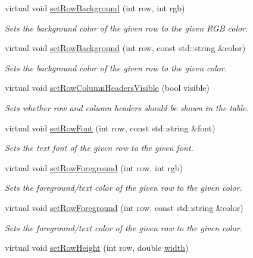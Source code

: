 \begin{DoxyCompactItemize}
virtual void \mbox{\hyperlink{classGTable_a85ee577aabd189ed64a5c9f66ba61fd2}{set\+Row\+Background}} (int row, int rgb)
\begin{DoxyCompactList}\small\item\em Sets the background color of the given row to the given R\+GB color. \end{DoxyCompactList}\item 
virtual void \mbox{\hyperlink{classGTable_a30c7073dfeac833056ed65a8bb9a7e08}{set\+Row\+Background}} (int row, const std\+::string \&color)
\begin{DoxyCompactList}\small\item\em Sets the background color of the given row to the given color. \end{DoxyCompactList}\item 
virtual void \mbox{\hyperlink{classGTable_a0d4a1d2a58daff8c1984e31b21f93ea1}{set\+Row\+Column\+Headers\+Visible}} (bool visible)
\begin{DoxyCompactList}\small\item\em Sets whether row and column headers should be shown in the table. \end{DoxyCompactList}\item 
virtual void \mbox{\hyperlink{classGTable_adaeccb3f3fd318185b8adc644aaca949}{set\+Row\+Font}} (int row, const std\+::string \&font)
\begin{DoxyCompactList}\small\item\em Sets the text font of the given row to the given font. \end{DoxyCompactList}\item 
virtual void \mbox{\hyperlink{classGTable_abe6e1382d3d98a9479cf43ac204b0ee3}{set\+Row\+Foreground}} (int row, int rgb)
\begin{DoxyCompactList}\small\item\em Sets the foreground/text color of the given row to the given color. \end{DoxyCompactList}\item 
virtual void \mbox{\hyperlink{classGTable_a27ede8127bd8889e3f71dfe152c1684d}{set\+Row\+Foreground}} (int row, const std\+::string \&color)
\begin{DoxyCompactList}\small\item\em Sets the foreground/text color of the given row to the given color. \end{DoxyCompactList}\item 
virtual void \mbox{\hyperlink{classGTable_a815f0bed3e7a76d99b4a026808a555b3}{set\+Row\+Height}} (int row, double \mbox{\hyperlink{classGTable_ad72663daf610f2a0833a2fc3d78e4fdf}{width}})

\end{DoxyCompactItemize}
